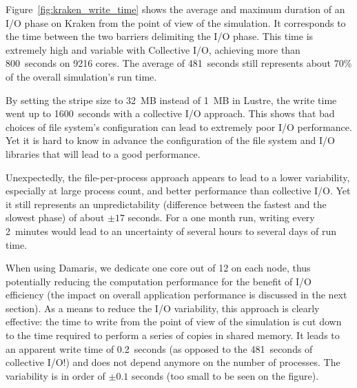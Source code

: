 Figure~\ref{fig:kraken_write_time} shows the average and maximum duration of 
an I/O phase on Kraken from the point of view of the simulation.
It corresponds to the time between the two barriers delimiting the I/O phase.
This time is extremely high and variable with Collective I/O, achieving more than 800~seconds
on 9216 cores. The average of 481~seconds still represents about 70\% 
of the overall simulation's run time.

By setting the stripe size to 32~MB instead of 1~MB in Lustre, the write time 
went up to 1600~seconds with a collective I/O approach. This shows that bad choices of 
file system's configuration can lead to extremely poor I/O performance.
Yet it is hard to know in advance the configuration of the file system and
I/O libraries that will lead to a good performance.

Unexpectedly, the file-per-process approach appears to lead to a lower 
variability, especially at large process count, and better performance
than collective I/O.
Yet it still represents an unpredictability (difference between the fastest and 
the slowest phase) of about $\pm 17$ seconds.
For a one month run, writing every 2~minutes would lead 
to an uncertainty of several hours to several days of run time.

When using Damaris, we dedicate one core out of 12 on each 
node, thus potentially reducing the computation performance for the
benefit of I/O efficiency (the impact on overall application performance is 
discussed in the next section). 
As a means to reduce the I/O variability, this approach is clearly effective: 
the time to write from the point of view of the simulation is cut down to the 
time required to perform a series of copies in shared memory. It leads to an apparent write 
time of 0.2~seconds (as opposed to the 481~seconds of collective I/O!) and does not depend anymore on
the number of processes. The variability is in order of $\pm 0.1$ seconds (too small to 
be seen on the figure).

